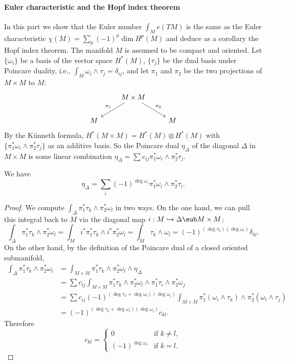 \paragraph{Euler characteristic and the Hopf index theorem}
In this part we show that the Euler number $\int_Me(TM)$ is the same as the Euler characteristic $\chi(M)=\sum_p(-1)^p\dim H^p(M)$ and deduce as a corollary the Hopf 
index theorem. The manifold $M$ is assumed to be compact and oriented.
Let $\{\omega_i\}$ be a basis of the vector space $H^*(M)$, $\{\tau_j\}$ be the dual basis under Poincare duality, i.e., $\int_M\omega_i\wedge\tau_j=\delta_{ij}$, and 
let $\pi_1$ and $\pi_2$ be the two projections of $M\times M$ to $M$:
\[\begin{tikzcd}
&M\times M\ar[ld,swap,"\pi_1"]\ar[rd,"\pi_2"]&\\
M&&M
\end{tikzcd}\]
By the K\"unneth formula, $H^*(M\times M)=H^*(M)\otimes H^*(M)$ with $\{\pi_1^*\omega_i\wedge\pi_2^*\tau_j\}$ as an additive basis. So the Poincare dual $\eta_{\Delta}$ of 
the diagonal $\Delta$ in $M\times M$ is some linear combination $\eta_{\Delta}=\sum c_{ij}\pi_1^*\omega_i\wedge\pi_2^*\tau_j$.
\begin{lemma}\label{Poincare dual diagonal}
We have 
\[\eta_{\Delta}=\sum_i(-1)^{\deg\omega_i}\pi_1^*\omega_i\wedge\pi_2^*\tau_i.\]
\end{lemma}
\begin{proof}
We compute $\int_{\Delta}\pi_1^*\tau_k\wedge\pi_2^*\omega_l$ in two ways. On the one hand, we can pull this integral back to $M$ via the diagonal map $i:M\hookrightarrow\Delta\sub M\times M$:
\[\int_{\Delta}\pi_1^*\tau_k\wedge\pi_2^*\omega_l=\int_{M}i^*\pi_1^*\tau_k\wedge i^*\pi_2^*\omega_l=\int_M\tau_k\wedge\omega_l=(-1)^{(\deg\tau_k)(\deg\omega_l)}\delta_{kl}.\]
On the other hand, by the definition of the Poincare dual of a closed oriented submanifold,
\begin{align*}
\int_{\Delta}\pi_1^*\tau_k\wedge\pi_2^*\omega_l&=\int_{M\times M}\pi_1^*\tau_k\wedge\pi_2^*\omega_l\wedge\eta_{\Delta}\\
&=\sum c_{ij}\int_{M\times M}\pi_1^*\tau_k\wedge\pi_2^*\omega_l\wedge\pi_1^*\tau_i\wedge\pi_2^*\omega_j\\
&=\sum c_{ij}(-1)^{(\deg\tau_k+\deg\omega_l)(\deg\omega_i)}\int_{M\times M}\pi_1^*(\omega_i\wedge\tau_k)\wedge\pi_2^*(\omega_l\wedge\tau_j)\\
&=(-1)^{(\deg\tau_k+\deg\omega_l)(\deg\omega_i)}c_{kl}.
\end{align*}
Therefore
\[c_{kl}=\begin{cases}
0&\text{if $k\neq l$},\\
(-1)^{\deg \omega_i}&\text{if $k=l$}.
\end{cases}\]
\end{proof}
